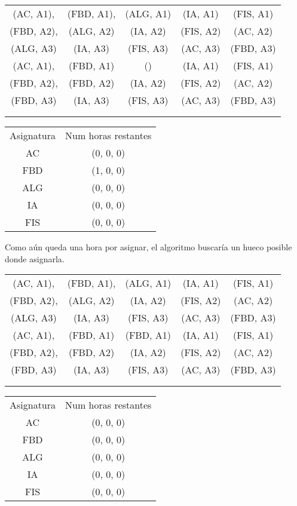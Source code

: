 \begin{minipage}{0.8\textwidth}    
\begin{tabular}{| c | c | c | c | c |}
\hline
 (AC, A1), & (FBD, A1), & (ALG, A1) & (IA, A1) & (FIS, A1) \\
 (FBD, A2), & (ALG, A2) & (IA, A2) & (FIS, A2) & (AC, A2) \\
 (ALG, A3) &  (IA, A3) & (FIS, A3) & (AC, A3) & (FBD, A3) \\
 \hline
 (AC, A1), & (FBD, A1) & () & (IA, A1) & (FIS, A1) \\
 (FBD, A2), & (FBD, A2) & (IA, A2) & (FIS, A2) & (AC, A2) \\
 (FBD, A3) & (IA, A3) & (FIS, A3) & (AC, A3) & (FBD, A3) \\
 \hline
 &  &  &  & \\
 \hline
 &  &  &  & \\
 \hline 
\end{tabular}
\end{minipage}
\begin{minipage}{1\textwidth}
\begin{tabular}{c | c}
Asignatura & Num horas restantes \\
AC & (0, 0, 0) \\
FBD & (1, 0, 0) \\
ALG & (0, 0, 0) \\
IA & (0, 0, 0) \\
FIS & (0, 0, 0)
\end{tabular}
\end{minipage}

Como aún queda una hora por asignar, el algoritmo buscaría un hueco posible donde asignarla.

\begin{minipage}{0.8\textwidth}    
\begin{tabular}{| c | c | c | c | c |}
\hline
 (AC, A1), & (FBD, A1), & (ALG, A1) & (IA, A1) & (FIS, A1) \\
 (FBD, A2), & (ALG, A2) & (IA, A2) & (FIS, A2) & (AC, A2) \\
 (ALG, A3) &  (IA, A3) & (FIS, A3) & (AC, A3) & (FBD, A3) \\
 \hline
 (AC, A1), & (FBD, A1) & (FBD, A1) & (IA, A1) & (FIS, A1) \\
 (FBD, A2), & (FBD, A2) & (IA, A2) & (FIS, A2) & (AC, A2) \\
 (FBD, A3) & (IA, A3) & (FIS, A3) & (AC, A3) & (FBD, A3) \\
 \hline
 &  &  &  & \\
 \hline
 &  &  &  & \\
 \hline 
\end{tabular}
\end{minipage}
\begin{minipage}{1\textwidth}
\begin{tabular}{c | c}
Asignatura & Num horas restantes \\
AC & (0, 0, 0) \\
FBD & (0, 0, 0) \\
ALG & (0, 0, 0) \\
IA & (0, 0, 0) \\
FIS & (0, 0, 0)
\end{tabular}
\end{minipage}

